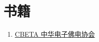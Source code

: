 \chapter{书籍}
\begin{enumerate}
  \item \href{http://www.cbeta.org/download/cbreader.htm}{CBETA 中华电子佛电协会}
\end{enumerate}
